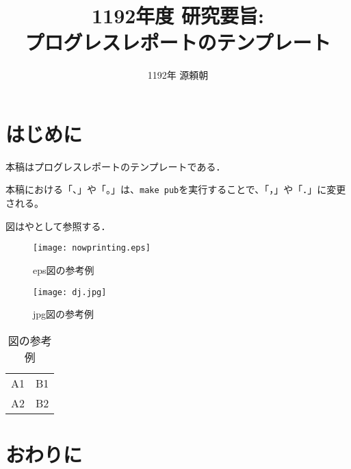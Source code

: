 \documentclass{jarticle}
\title{1192年度 研究要旨: \\
プログレスレポートのテンプレート}
\author{1192年 源頼朝}
\begin{document}
\pagestyle{empty}
\maketitle
\thispagestyle{empty}
\sloppy

\section{はじめに}

本稿はプログレスレポートのテンプレートである\cite{Sakai}．

本稿における「、」や「。」は、\verb|make pub|を実行することで、「，」や「．」に変更される。

図はやとして参照する．

\begin{figure}[tbh]
 \begin{center}
  \begin{minipage}{0.3\columnwidth}
   \texttt{[image: nowprinting.eps]}
   \caption{eps図の参考例}
  \end{minipage}
  \hspace{0.15\columnwidth}
  \begin{minipage}{0.3\columnwidth}
   \texttt{[image: dj.jpg]}
   \caption{jpg図の参考例}
  \end{minipage}
  \label{figure:nowprinting}
 \end{center}
\end{figure}

\begin{table}[tbh]
 \begin{center}
  \begin{tabular}{|l|r|} \hline
  A1 & B1 \\
  A2 & B2 \\ \hline
  \end{tabular}
  \caption{図の参考例}
  \label{table:sample}
 \end{center}
\end{table}

\section{おわりに}



\end{document}
